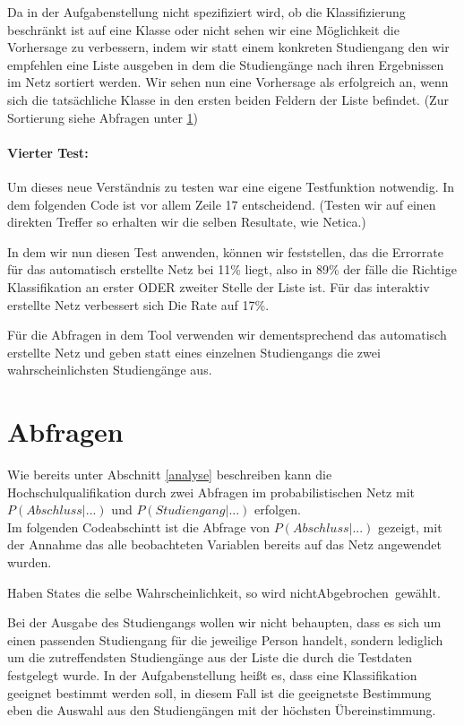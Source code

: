 Da in der Aufgabenstellung nicht spezifiziert wird, ob die Klassifizierung beschränkt ist auf eine Klasse oder nicht sehen wir eine Möglichkeit die Vorhersage zu verbessern, indem wir statt einem konkreten Studiengang den wir empfehlen eine Liste ausgeben in dem die Studiengänge nach ihren Ergebnissen im Netz sortiert werden. Wir sehen nun eine Vorhersage als erfolgreich an, wenn sich die tatsächliche Klasse in den ersten beiden Feldern der Liste befindet. (Zur Sortierung siehe Abfragen unter \ref{abfragen})
 
\paragraph{Vierter Test: }Um dieses neue Verständnis zu testen war eine eigene Testfunktion notwendig. In dem folgenden Code ist vor allem Zeile 17 entscheidend. (Testen wir auf einen direkten Treffer so erhalten wir die selben Resultate, wie Netica.)



In dem wir nun diesen Test anwenden, können wir feststellen, das die Errorrate für das automatisch erstellte Netz bei 11\% liegt, also in 89\% der fälle die Richtige Klassifikation an erster ODER zweiter Stelle der Liste ist. Für das interaktiv erstellte Netz verbessert sich Die Rate auf 17\%. 

Für die Abfragen in dem Tool verwenden wir dementsprechend das automatisch erstellte Netz und geben statt eines einzelnen Studiengangs die zwei wahrscheinlichsten Studiengänge aus. 

\section{Abfragen}\label{abfragen}
Wie bereits unter Abschnitt \ref{analyse} beschreiben kann die Hochschulqualifikation durch zwei Abfragen im probabilistischen Netz mit $P(Abschluss|...)$ und $P(Studiengang|...)$ erfolgen.\\

Im folgenden Codeabschintt ist die Abfrage von $P(Abschluss|...)$ gezeigt, mit der Annahme das alle beobachteten Variablen bereits auf das Netz angewendet wurden.



Haben States die selbe Wahrscheinlichkeit, so wird \glqq nichtAbgebrochen\grqq \ gewählt.

Bei der Ausgabe des Studiengangs wollen wir nicht behaupten, dass es sich um einen passenden Studiengang für die jeweilige Person handelt, sondern lediglich um die zutreffendsten Studiengänge aus der Liste die durch die Testdaten festgelegt wurde. In der Aufgabenstellung heißt es, dass eine Klassifikation geeignet bestimmt werden soll, in diesem Fall ist die geeignetste Bestimmung eben die Auswahl aus den Studiengängen mit der höchsten Übereinstimmung. 

